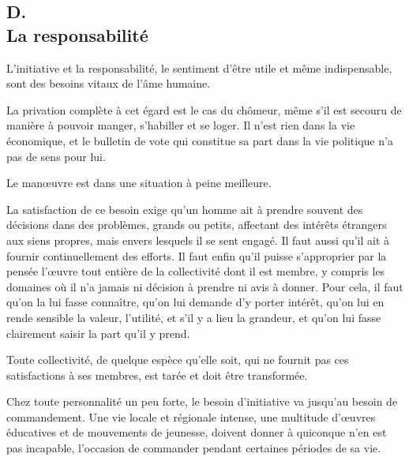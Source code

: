 \documentclass[french,twoside]{book} %
\begin{document}
\subsection[{D. La responsabilité}]{D. \\
La responsabilité}
\noindent \par
L'initiative et la responsabilité, le sentiment d'être utile et même indispensable, sont des besoins vitaux de l'âme humaine.\par
La privation complète à cet égard est le cas du chômeur, même s'il est secouru de manière à pouvoir manger, s'habiller et se loger. Il n'est rien dans la vie économique, et le bulletin de vote qui constitue sa part dans la vie politique n'a pas de sens pour lui.\par
Le manœuvre est dans une situation à peine meilleure.\par
La satisfaction de ce besoin exige qu'un homme ait à prendre souvent des décisions dans des problèmes, grands ou petits, affectant des intérêts étrangers aux siens propres, mais envers lesquels il se sent engagé. Il faut aussi qu'il ait à fournir continuellement des efforts. Il faut enfin qu'il puisse s'approprier par la pensée l'œuvre tout entière de la collectivité dont il est membre, y compris les domaines où il n'a jamais ni décision à prendre ni avis à donner. Pour cela, il faut qu'on la lui fasse connaître, qu'on lui demande d'y porter intérêt, qu'on lui en rende sensible la valeur, l'utilité, et s'il y a lieu la grandeur, et qu'on lui fasse clairement saisir la part qu'il y prend.\par
Toute collectivité, de quelque espèce qu'elle soit, qui ne fournit pas ces satisfactions à ses membres, est tarée et doit être transformée.\par
Chez toute personnalité un peu forte, le besoin d'initiative va jusqu'au besoin de commandement. Une vie locale et régionale intense, une multitude d'œuvres éducatives et de mouvements de jeunesse, doivent donner à quiconque n'en est pas incapable, l'occasion de commander pendant certaines périodes de sa vie.\par
\end{document}
